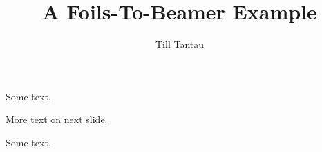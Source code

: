 \documentclass{beamer}
\title{A Foils-To-Beamer Example}
\author{Till Tantau}
\begin{document}
\frame{
\maketitle
}


Some text.

\pagebreak

More text on next slide.


Some text.

\endfoil
\end{document}
